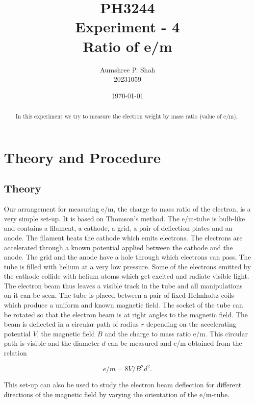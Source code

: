 \documentclass[%
sor,
 jor,
 amsmath,amssymb,
 reprint,
]{revtex4-2}
\begin{document}
\title{PH3244\\Experiment - 4\\ Ratio of e/m}
\author{Aumshree P. Shah\\20231059}
\date{\today}
\begin{abstract}
\centering
In this experiment we try to measure the electron weight by mass ratio (value of e/m).
\end{abstract}
\maketitle
\tableofcontents
\vspace*{\fill}
\pagebreak

\section{Theory and Procedure}
\subsection{Theory}

Our arrangement for measuring e/m, the charge to mass ratio of the electron, is a very simple set-up. It is based on Thomson's method. The e/m-tube is bulb-like and contains a filament, a cathode, a grid, a pair of deflection plates and an anode. The filament heats the cathode which emits electrons. The electrons are accelerated through a known potential applied between the cathode and the anode. The grid and the anode have a hole through which electrons can pass. The tube is filled with helium at a very low pressure. Some of the electrons emitted by the cathode collide with helium atoms which get excited and radiate visible light. The electron beam thus leaves a visible track in the tube and all manipulations on it can be seen. The tube is placed between a pair of fixed Helmholtz coils which produce a uniform and known magnetic field. The socket of the tube can be rotated so that the electron beam is at right angles to the magnetic field. The beam is deflected in a circular path of radius $r$ depending on the accelerating potential $V$, the magnetic field $B$ and the charge to mass ratio e/m. This circular path is visible and the diameter $d$ can be measured and e/m obtained from the relation

\[
e/m = 8V / B^2 d^2.
\]

This set-up can also be used to study the electron beam deflection for different directions of the magnetic field by varying the orientation of the e/m-tube.
\end{document}
